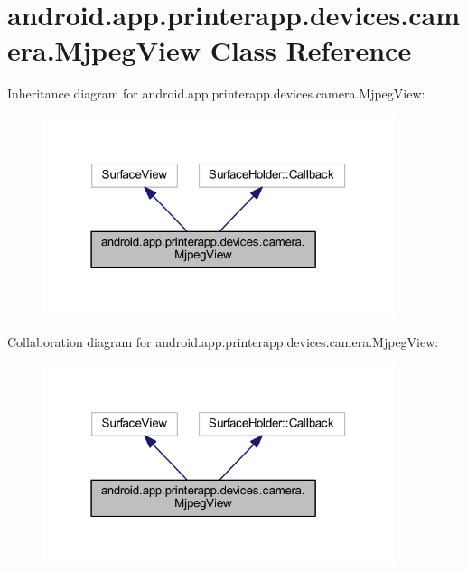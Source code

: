 \hypertarget{classandroid_1_1app_1_1printerapp_1_1devices_1_1camera_1_1_mjpeg_view}{}\section{android.\+app.\+printerapp.\+devices.\+camera.\+Mjpeg\+View Class Reference}
\label{classandroid_1_1app_1_1printerapp_1_1devices_1_1camera_1_1_mjpeg_view}


Inheritance diagram for android.\+app.\+printerapp.\+devices.\+camera.\+Mjpeg\+View\+:
\nopagebreak
\begin{figure}[H]
\begin{center}
\leavevmode
\includegraphics[width=291pt]{classandroid_1_1app_1_1printerapp_1_1devices_1_1camera_1_1_mjpeg_view__inherit__graph}
\end{center}
\end{figure}


Collaboration diagram for android.\+app.\+printerapp.\+devices.\+camera.\+Mjpeg\+View\+:
\nopagebreak
\begin{figure}[H]
\begin{center}
\leavevmode
\includegraphics[width=291pt]{classandroid_1_1app_1_1printerapp_1_1devices_1_1camera_1_1_mjpeg_view__coll__graph}
\end{center}
\end{figure}
